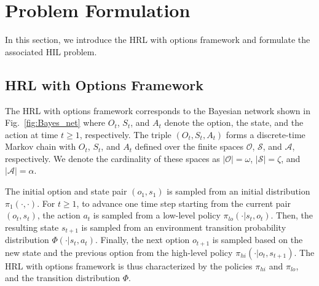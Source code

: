 \section{Problem Formulation}
\label{sec:problem}

In this section, we introduce the HRL with \citep{Bauer:2007}options framework \citep{SUTTON1999181,Barto2003} and formulate the associated HIL problem.

\subsection{HRL with Options Framework}
The HRL with options framework corresponds to the Bayesian network shown in Fig.~\ref{fig:Bayes_net} where $O_t$, $S_t$, and $A_t$ denote the option, the state, and the action at time $t \geq 1$, respectively.
The triple $(O_t,S_t,A_t)$ forms a discrete-time Markov chain with $O_t$, $S_t$, and $A_t$ defined over the finite spaces $\mathcal{O}$, $\mathcal{S}$, and $\mathcal{A}$, respectively.
We denote the cardinality of these spaces as 
$\vert\mathcal{O}\vert=\omega$, $\vert\mathcal{S}\vert=\zeta$, and $\vert\mathcal{A}\vert=\alpha$.

The initial option and state pair $(o_1, s_1)$ is sampled from an initial distribution $\pi_1( \cdot, \cdot )$.
For $t \geq 1$, to advance one time step starting from the current pair $(o_t, s_t)$, the action $a_t$ is sampled from a low-level policy $\pi_{lo}(\cdot\vert s_t,o_t)$.
Then, the resulting state $s_{t+1}$ is sampled from an environment transition probability distribution $\Phi(\cdot\vert s_t,a_t)$.
Finally, the next option $o_{t+1}$ is sampled based on the new state and the previous option from the high-level policy $\pi_{hi}(\cdot\vert o_t,s_{t+1})$.
The HRL with options framework is thus characterized by the policies $\pi_{hi}$ and $\pi_{lo}$, and the transition distribution $\Phi$.

